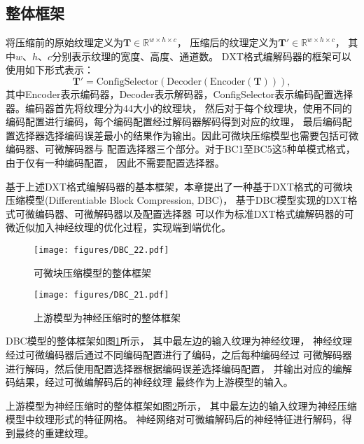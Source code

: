 \subsection{整体框架}

将压缩前的原始纹理定义为$\mathbf{T}\in \mathbb{R}^{w\times h\times c}$，
压缩后的纹理定义为$\mathbf{T}'\in \mathbb{R}^{w\times h\times c}$，
其中$w$、$h$、$c$分别表示纹理的宽度、高度、通道数。
DXT格式编解码器的框架可以使用如下形式表示：
\begin{equation}
    \mathbf{T}'=\text{ConfigSelector}(\text{Decoder}(\text{Encoder}(\mathbf{T}))),
\end{equation}
其中Encoder表示编码器，Decoder表示解码器，ConfigSelector表示编码配置选择器。编码器首先将纹理分为4\times4大小的纹理块，
然后对于每个纹理块，使用不同的编码配置进行编码，每个编码配置经过解码器解码得到对应的纹理，
最后编码配置选择器选择编码误差最小的结果作为输出。因此可微块压缩模型也需要包括可微编码器、可微解码器与
配置选择器三个部分。对于BC1至BC5这5种单模式格式，由于仅有一种编码配置，
因此不需要配置选择器。

基于上述DXT格式编解码器的基本框架，本章提出了一种基于DXT格式的可微块压缩模型(Differentiable Block Compression, DBC)， 
基于DBC模型实现的DXT格式可微编码器、可微解码器以及配置选择器
可以作为标准DXT格式编解码器的可微近似加入神经纹理的优化过程，实现端到端优化。

\begin{figure}[htbp]
    \centering
    \texttt{[image: figures/DBC\_22.pdf]}
    \caption{可微块压缩模型的整体框架}
    \label{fig:DBC_overview}
\end{figure}

\begin{figure}[htbp]
    \centering
    \texttt{[image: figures/DBC\_21.pdf]}
    \caption{上游模型为神经压缩时的整体框架}
    \label{fig:DBC_nm}
\end{figure}

DBC模型的整体框架如图\ref{fig:DBC_overview}所示，
其中最左边的输入纹理为神经纹理，
神经纹理经过可微编码器后通过不同编码配置进行了编码，之后每种编码经过
可微解码器进行解码，然后使用配置选择器根据编码误差选择编码配置，
并输出对应的编解码结果，经过可微编解码后的神经纹理
最终作为上游模型的输入。

上游模型为神经压缩时的整体框架如图\ref{fig:DBC_nm}所示，
其中最左边的输入纹理为神经压缩模型中纹理形式的特征网格。
神经网络对可微编解码后的神经特征进行解码，得到最终的重建纹理。

